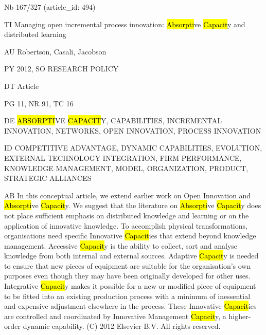 \documentclass[a4paper]{article}
\begin{document}
\vspace*{-2cm}
Nb \tabto{0cm}167/327 (article\_id: 494)\par
TI \tabto{0cm}Managing open incremental process innovation: \hl{Absorpti}ve \hl{Capacit}y and distributed learning\par
AU \tabto{0cm}Robertson, Casali, Jacobson\par
PY \tabto{0cm}2012, SO RESEARCH POLICY\par
DT \tabto{0cm}Article\par
PG \tabto{0cm}11, NR 91, TC 16\par
DE \tabto{0cm}\hl{ABSORPTI}VE \hl{CAPACIT}Y, CAPABILITIES, INCREMENTAL INNOVATION, NETWORKS, OPEN INNOVATION, PROCESS INNOVATION\par
ID \tabto{0cm}COMPETITIVE ADVANTAGE, DYNAMIC CAPABILITIES, EVOLUTION, EXTERNAL TECHNOLOGY INTEGRATION, FIRM PERFORMANCE, KNOWLEDGE MANAGEMENT, MODEL, ORGANIZATION, PRODUCT, STRATEGIC ALLIANCES\par
AB \tabto{0cm}In this conceptual article, we extend earlier work on Open Innovation and \hl{Absorpti}ve \hl{Capacit}y. We suggest that the literature on \hl{Absorpti}ve \hl{Capacit}y does not place sufficient emphasis on distributed knowledge and learning or on the application of innovative knowledge. To accomplish physical transformations, organisations need specific Innovative \hl{Capacit}ies that extend beyond knowledge management. Accessive \hl{Capacit}y is the ability to collect, sort and analyse knowledge from both internal and external sources. Adaptive \hl{Capacit}y is needed to ensure that new pieces of equipment are suitable for the organisation's own purposes even though they may have been originally developed for other uses. Integrative \hl{Capacit}y makes it possible for a new or modified piece of equipment to be fitted into an existing production process with a minimum of inessential and expensive adjustment elsewhere in the process. These Innovative \hl{Capacit}ies are controlled and coordinated by Innovative Management \hl{Capacit}y, a higher-order dynamic capability. (C) 2012 Elsevier B.V. All rights reserved.\par
\clearpage
\end{document}
